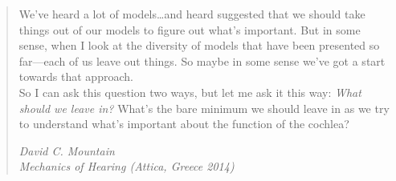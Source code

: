 \phantom{.}
\vspace{4in}

\begin{singlespace}
\begin{quote}
  We've heard a lot of models\ldots{}and heard suggested that we should take things out of our models to figure out what's important.  But in some sense, when I look at the diversity of models that have been presented so far---each of us leave out things.  So maybe in some sense we've got a start towards that approach.\\  
  
  So I can ask this question two ways, but let me ask it this way: \emph{What should we leave in?} What's the bare minimum we should leave in as we try to understand what's important about the function of the cochlea?
  \vspace{2.5em}
  \begin{flushright}
  \textit{David C. Mountain\\Mechanics of Hearing (Attica, Greece 2014)}
  \end{flushright}
\end{quote}
\end{singlespace}
  

%
